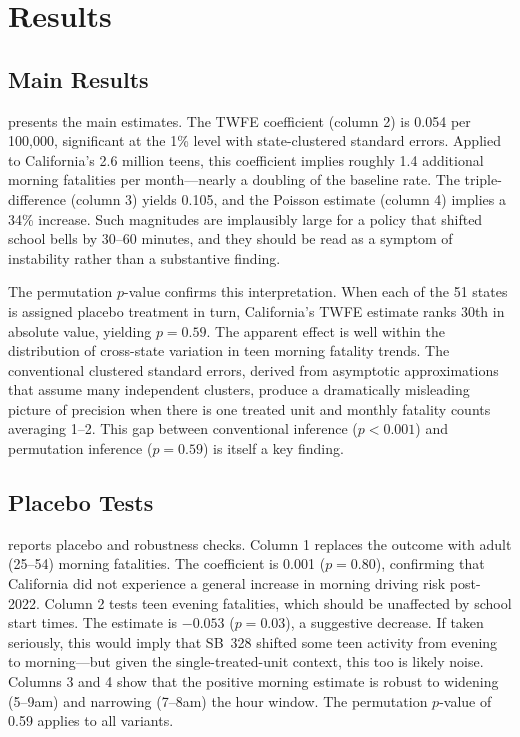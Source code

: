 \documentclass[12pt]{article}
\begin{document}
\section{Results}

\subsection{Main Results}



 presents the main estimates. The TWFE coefficient (column 2) is 0.054 per 100,000, significant at the 1\% level with state-clustered standard errors. Applied to California's 2.6 million teens, this coefficient implies roughly 1.4 additional morning fatalities per month---nearly a doubling of the baseline rate. The triple-difference (column 3) yields 0.105, and the Poisson estimate (column 4) implies a 34\% increase. Such magnitudes are implausibly large for a policy that shifted school bells by 30--60 minutes, and they should be read as a symptom of instability rather than a substantive finding.

The permutation $p$-value confirms this interpretation. When each of the 51 states is assigned placebo treatment in turn, California's TWFE estimate ranks 30th in absolute value, yielding $p = 0.59$. The apparent effect is well within the distribution of cross-state variation in teen morning fatality trends. The conventional clustered standard errors, derived from asymptotic approximations that assume many independent clusters, produce a dramatically misleading picture of precision when there is one treated unit and monthly fatality counts averaging 1--2. This gap between conventional inference ($p < 0.001$) and permutation inference ($p = 0.59$) is itself a key finding.

\subsection{Placebo Tests}



 reports placebo and robustness checks. Column 1 replaces the outcome with adult (25--54) morning fatalities. The coefficient is 0.001 ($p = 0.80$), confirming that California did not experience a general increase in morning driving risk post-2022. Column 2 tests teen evening fatalities, which should be unaffected by school start times. The estimate is $-0.053$ ($p = 0.03$), a suggestive decrease. If taken seriously, this would imply that SB~328 shifted some teen activity from evening to morning---but given the single-treated-unit context, this too is likely noise. Columns 3 and 4 show that the positive morning estimate is robust to widening (5--9am) and narrowing (7--8am) the hour window. The permutation $p$-value of 0.59 applies to all variants.
\end{document}
